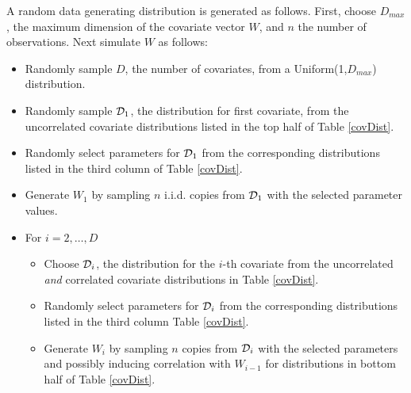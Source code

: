 \documentclass[12pt]{article}
\begin{document}
A random data generating distribution is generated as follows. First, choose $D_{max}$, the maximum dimension of the covariate vector $W$, and $n$ the number of observations. Next simulate $W$ as follows: \begin{itemize}
\item Randomly sample $D$, the number of covariates, from a Uniform(1,$D_{max}$) distribution. 
\item Randomly sample ${\cal D}_1$, the distribution for first covariate, from the uncorrelated covariate distributions listed in the top half of Table \ref{covDist}. 
\item Randomly select parameters for ${\cal D}_1$ from the corresponding distributions listed in the third column of Table \ref{covDist}. 
\item Generate $W_1$ by sampling $n$ i.i.d. copies from ${\cal D}_1$ with the selected parameter values. 
\item For $i = 2,\dots,D$ \begin{itemize}
\item Choose ${\cal D}_i$, the distribution for the $i$-th covariate from the uncorrelated \emph{and} correlated covariate distributions in Table \ref{covDist}. 
\item Randomly select parameters for ${\cal D}_i$ from the corresponding distributions listed in the third column Table \ref{covDist}. 
\item Generate $W_i$ by sampling $n$ copies from ${\cal D}_i$ with the selected parameters and possibly inducing correlation with $W_{i-1}$ for distributions in bottom half of Table \ref{covDist}.
\end{itemize}
\end{itemize}
\end{document}
